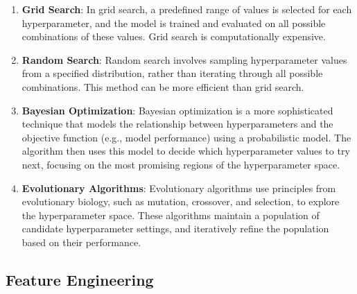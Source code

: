 \documentclass[12pt]{article}
\begin{document}
\begin{enumerate}
\item \textbf{Grid Search}: In grid search, a predefined range of values is selected for each hyperparameter, and the model is trained and evaluated on all possible combinations of these values. Grid search is computationally expensive.

\item \textbf{Random Search}: Random search involves sampling hyperparameter values from a specified distribution, rather than iterating through all possible combinations. This method can be more efficient than grid search.

\item \textbf{Bayesian Optimization}: Bayesian optimization is a more sophisticated technique that models the relationship between hyperparameters and the objective function (e.g., model performance) using a probabilistic model. The algorithm then uses this model to decide which hyperparameter values to try next, focusing on the most promising regions of the hyperparameter space.

\item \textbf{Evolutionary Algorithms}: Evolutionary algorithms use principles from evolutionary biology, such as mutation, crossover, and selection, to explore the hyperparameter space. These algorithms maintain a population of candidate hyperparameter settings, and iteratively refine the population based on their performance.
\end{enumerate}

\subsection{Feature Engineering}
\end{document}
